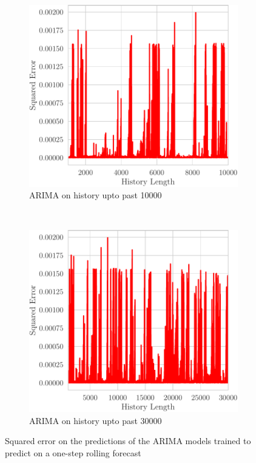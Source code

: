 \begin{figure}[h]
    \centering
    \begin{subfigure}[h]{0.5\textwidth}
        \centering
        \includegraphics[scale=0.55]{figures/SE_trend_arima_10000.pdf}
        \caption{ARIMA on history upto past 10000}
    \end{subfigure}%
    ~ 
    \begin{subfigure}[h]{0.5\textwidth}
        \centering
        \includegraphics[scale=0.55]{figures/SE_trend_arima_30000.pdf}
        \caption{ARIMA on history upto past 30000}
    \end{subfigure}
    \caption{Squared error on the predictions of the ARIMA models trained to predict on a one-step rolling forecast }
    \label{fig:arima}
\end{figure}

